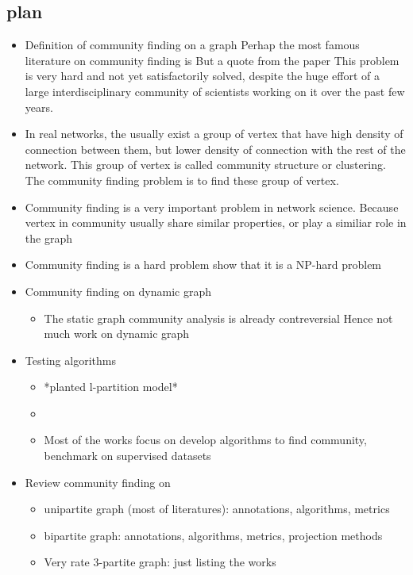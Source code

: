 \subsection{plan}
\begin{itemize}
	\item Definition of community finding on a graph
	      Perhap the most famous literature on community finding is \cite{fortunato2010}
	      But a quote from the paper
	      This problem is very hard and not yet satisfactorily solved, despite the huge effort of a large interdisciplinary community of scientists working on it over the past few years.
	\item In real networks, the usually exist a group of vertex that have high density of connection between them,
	      but lower density of connection with the rest of the network.
	      This group of vertex is called community structure or clustering.
	      The community finding problem is to find these group of vertex.
	\item Community finding is a very important problem in network science.
	      Because vertex in community usually share similar properties, or play a similiar role in the graph

	\item Community finding is a hard problem
	      \cite{fortunato2010} show that it is a NP-hard problem
	\item Community finding on dynamic graph
	      \begin{itemize}
		      \item The static graph community analysis is already contreversial
		            Hence not much work on dynamic graph
	      \end{itemize}
	\item Testing algorithms
	      \begin{itemize}
		      \item *planted l-partition model* \cite{fortunato2010}
		      \item
	      \end{itemize}
	      \begin{itemize}
		      \item Most of the works focus on develop algorithms to find community, benchmark on supervised datasets
	      \end{itemize}
	\item Review community finding on
	      \begin{itemize}
		      \item unipartite graph (most of literatures): annotations, algorithms, metrics
		      \item bipartite graph: annotations, algorithms, metrics, projection methods
		      \item Very rate 3-partite graph: just listing the works
	      \end{itemize}

\end{itemize}

\cite{fortunato2010}
\cite{newman2004}